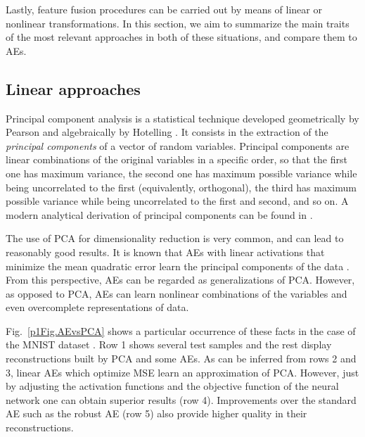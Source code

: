 Lastly, feature fusion procedures can be carried out by means of linear or nonlinear transformations. In this section, we aim to summarize the main traits of the most relevant approaches in both of these situations, and compare them to AEs. 

\subsection{Linear approaches}

Principal component analysis is a statistical technique developed geometrically by Pearson  and algebraically by Hotelling . It consists in the extraction of the \textit{principal components} of a vector of random variables. Principal components are linear combinations of the original variables in a specific order, so that the first one has maximum variance, the second one has maximum possible variance while being uncorrelated to the first (equivalently, orthogonal), the third has maximum possible variance while being uncorrelated to the first and second, and so on. A modern analytical derivation of principal components can be found in .

The use of PCA for dimensionality reduction is very common, and can lead to reasonably good results. It is known that AEs with linear activations that minimize the mean quadratic error learn the principal components of the data . From this perspective, AEs can be regarded as generalizations of PCA. However, as opposed to PCA, AEs can learn nonlinear combinations of the variables and even overcomplete representations of data.

Fig.~\ref{p1Fig.AEvsPCA} shows a particular occurrence of these facts in the case of the MNIST dataset . Row 1 shows several test samples and the rest display reconstructions built by PCA and some AEs. As can be inferred from rows 2 and 3, linear AEs which optimize MSE learn an approximation of PCA. However, just by adjusting the activation functions and the objective function of the neural network one can obtain superior results (row 4). Improvements over the standard AE such as the robust AE (row 5) also provide higher quality in their reconstructions.

